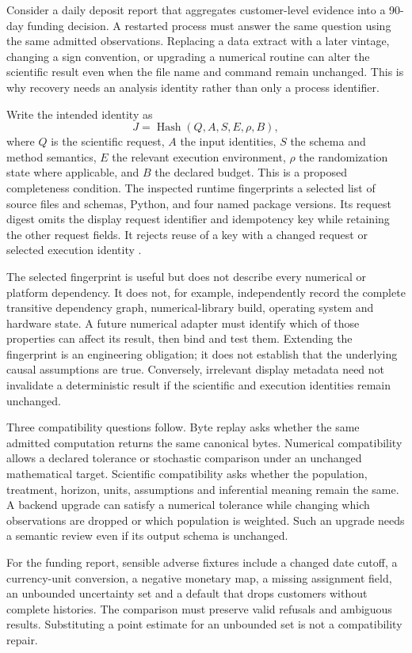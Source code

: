 Consider a daily deposit report that aggregates customer-level evidence into
a 90-day funding decision. A restarted process must answer the same question
using the same admitted observations. Replacing a data extract with a later
vintage, changing a sign convention, or upgrading a numerical routine can
alter the scientific result even when the file name and command remain
unchanged. This is why recovery needs an analysis identity rather than only
a process identifier.

Write the intended identity as
\[
 J=\operatorname{Hash}(Q,A,S,E,\rho,B),
\]
where $Q$ is the scientific request, $A$ the input identities, $S$ the schema
and method semantics, $E$ the relevant execution environment, $\rho$ the
randomization state where applicable, and $B$ the declared budget. This is a
proposed completeness condition. The inspected runtime fingerprints a selected
list of source files and schemas, Python, and four named package versions.
Its request digest omits the display request identifier and idempotency key
while retaining the other request fields. It rejects reuse of a key with a
changed request or selected execution identity
\cite{exec13_ops_source}.

The selected fingerprint is useful but does not describe every numerical or
platform dependency. It does not, for example, independently record the
complete transitive dependency graph, numerical-library build, operating
system and hardware state. A future numerical adapter must identify which
of those properties can affect its result, then bind and test them. Extending
the fingerprint is an engineering obligation; it does not establish that the
underlying causal assumptions are true. Conversely, irrelevant display
metadata need not invalidate a deterministic result if the scientific and
execution identities remain unchanged.

Three compatibility questions follow. Byte replay asks whether the same
admitted computation returns the same canonical bytes. Numerical compatibility
allows a declared tolerance or stochastic comparison under an unchanged
mathematical target. Scientific compatibility asks whether the population,
treatment, horizon, units, assumptions and inferential meaning remain the
same. A backend upgrade can satisfy a numerical tolerance while changing
which observations are dropped or which population is weighted. Such an
upgrade needs a semantic review even if its output schema is unchanged.

For the funding report, sensible adverse fixtures include a changed date
cutoff, a currency-unit conversion, a negative monetary map, a missing
assignment field, an unbounded uncertainty set and a default that drops
customers without complete histories. The comparison must preserve valid
refusals and ambiguous results. Substituting a point estimate for an
unbounded set is not a compatibility repair.

